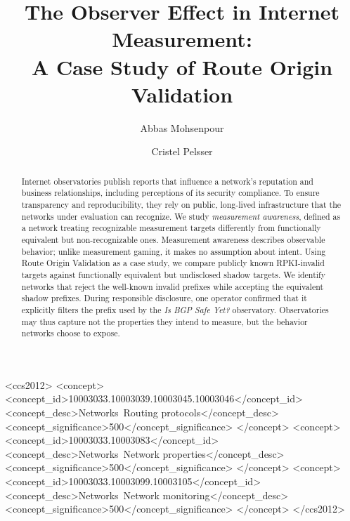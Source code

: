 \documentclass[sigconf, 10pt]{acmart}
\title[The Observer Effect in Internet Measurement]{The Observer Effect in Internet Measurement:\\A Case Study of Route Origin Validation}
\author{Abbas Mohsenpour}
\affiliation{%
  \institution{UCLouvain}
  \country{Belgium}
}
\author{Cristel Pelsser}
\affiliation{%
  \institution{UCLouvain}
  \country{Belgium}
}
\begin{document}

\begin{CCSXML}
<ccs2012>
   <concept>
       <concept_id>10003033.10003039.10003045.10003046</concept_id>
       <concept_desc>Networks~Routing protocols</concept_desc>
       <concept_significance>500</concept_significance>
       </concept>
   <concept>
       <concept_id>10003033.10003083</concept_id>
       <concept_desc>Networks~Network properties</concept_desc>
       <concept_significance>500</concept_significance>
       </concept>
   <concept>
       <concept_id>10003033.10003099.10003105</concept_id>
       <concept_desc>Networks~Network monitoring</concept_desc>
       <concept_significance>500</concept_significance>
       </concept>
 </ccs2012>
\end{CCSXML}



\begin{abstract}
Internet observatories publish reports that influence a network’s reputation and business relationships, including perceptions of its security compliance. To ensure transparency and reproducibility, they rely on public, long-lived infrastructure that the networks under evaluation can recognize. We study \emph{measurement awareness}, defined as a network treating recognizable measurement targets differently from functionally equivalent but non-recognizable ones. Measurement awareness describes observable behavior; unlike measurement gaming, it makes no assumption about intent.
Using Route Origin Validation as a case study, we compare publicly known RPKI-invalid targets against functionally equivalent but undisclosed shadow targets. We identify networks that reject the well-known invalid prefixes while accepting the equivalent shadow prefixes. During responsible disclosure, one operator confirmed that it explicitly filters the prefix used by the \emph{Is BGP Safe Yet?} observatory. Observatories may thus capture not the properties they intend to measure, but the behavior networks choose to expose.
\end{abstract}
\end{document}
